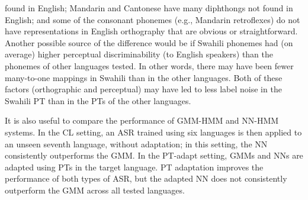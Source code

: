 found in English; Mandarin and 
Cantonese have many diphthongs not found in English; and some of the 
consonant phonemes (e.g., Mandarin retroflexes) do not have 
representations in English orthography that are obvious or 
straightforward. Another possible source of the difference would be if
Swahili phonemes had (on average) higher perceptual discriminability 
(to English speakers) than the phonemes of other languages tested. In
other words, there may have been fewer many-to-one mappings in Swahili
than in the other languages.
Both of these factors (orthographic and 
perceptual) may have led to less label noise in the Swahili PT than in 
the PTs of the other languages. 

It is also useful to compare the performance of GMM-HMM and NN-HMM
systems.  In the {\sc CL} setting, an ASR trained
using six languages is then applied to an unseen seventh language,
without adaptation; in this setting, the NN consistently outperforms
the GMM.  In the {\sc PT-adapt} setting, GMMs and NNs are
adapted using PTs in the target language.  PT adaptation improves the
performance of both types of ASR, but the
adapted NN does not consistently outperform the GMM across all
tested languages.

